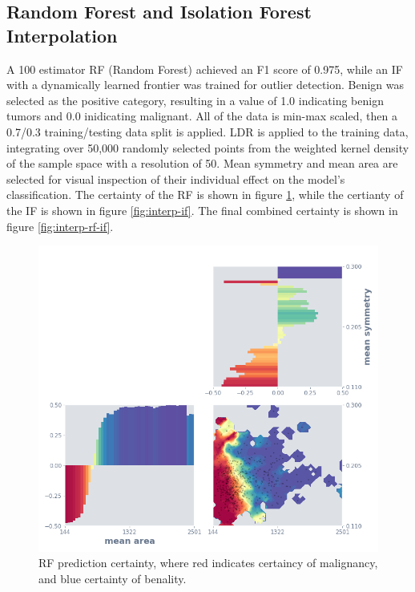 \documentclass[a4paper, twocolumn]{article}
\begin{document}
\subsection{Random Forest and Isolation Forest Interpolation}

A 100 estimator RF (Random Forest) \cite{liaw2002classification} achieved an F1 score of 0.975, while an IF with a dynamically learned frontier was trained for outlier detection. Benign was selected as the positive category, resulting in a value of 1.0 indicating benign tumors and 0.0 inidicating malignant. All of the data is min-max scaled, then a 0.7/0.3 training/testing data split is applied. LDR is applied to the training data, integrating over 50,000 randomly selected points from the weighted kernel density of the sample space with a resolution of 50. Mean symmetry and mean area are selected for visual inspection of their individual effect on the model's classification. The certainty of the RF is shown in figure \ref{fig:interp-rf}, while the certianty of the IF is shown in figure \ref{fig:interp-if}. The final combined certainty is shown in figure \ref{fig:interp-rf-if}.

\begin{figure}
\centering
\includegraphics[width=0.8\columnwidth]{img/interp_rf.png}
\caption{RF prediction certainty, where red indicates certaincy of malignancy, and blue certainty of benality.}
\label{fig:interp-rf}
\end{figure}
\end{document}
